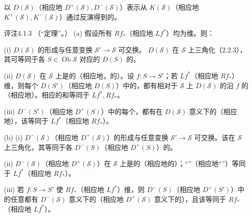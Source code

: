 以 $D(\mathscr S)$（相应地 $D^+(\mathscr S),D^-(\mathscr S)$）表示从 $K(\mathscr S)$（相应地 $K^+(\mathscr S),K^-(\mathscr S)$）通过反演得到的。
\begin{SGAresult}{评注}{4.1.3}
（“定理”。）
(a) 假设所有 $Rf_*$（相应地 $Lf^*$）均为维。则：

(i) $D(\mathscr S)$ 的形成与任意变换 $\mathscr S'\to\mathscr S$ 可交换。 $D(\mathscr S)$ 在 $\mathscr S$ 上三角化（2.2.3），其可等同于各 $S\in\operatorname{Ob}\mathscr S$ 对应的 $D(S)$ 的。

(ii)  $D(\mathscr S)$ 在 $\mathscr S$ 上是的（相应地，的）。设 $f:S\to S'$；若 $Lf^*$（相应地 $Rf_*$）维，则每个 $D(S')$（相应地 $D(S)$）中的，都有相对于 $\mathscr S$ 上 $D(\mathscr S)$ 的沿 $f$ 的（相应地）。相应的和等同于 $Lf^*,Rf_*$。

(iii) $D^-(S')$（相应地 $D^+(S)$）中的每个，都有在 $D(\mathscr S)$ 意义下的（相应地），该等同于 $Lf^*$（相应地 $Rf_*$）。

(b) (i) $D^-(\mathscr S)$（相应地 $D^+(\mathscr S)$）的形成与任意变换 $\mathscr S'\to\mathscr S$ 可交换。该在 $\mathscr S$ 上三角化，其等同于各 $D^-(S)$（相应地 $D^+(S)$）的。

(ii)  $D^-(\mathscr S)$（相应地 $D^+(\mathscr S)$）在 $\mathscr S$ 上是的（相应地的）；“”（相应地“”）等同于 $Lf^*$（相应地 $Rf_*$）。

(iii) 若 $f:S\to S'$ 使 $Rf_*$（相应地 $Lf^*$）维，则 $D^-(S)$（相应地 $D^+(S')$）中的任意都有 $D^-(\mathscr S)$ 意义下的（相应地 $D^+(\mathscr S)$ 意义下的），且该等同于 $Rf_*$（相应地 $Lf^*$）。
\end{SGAresult}
